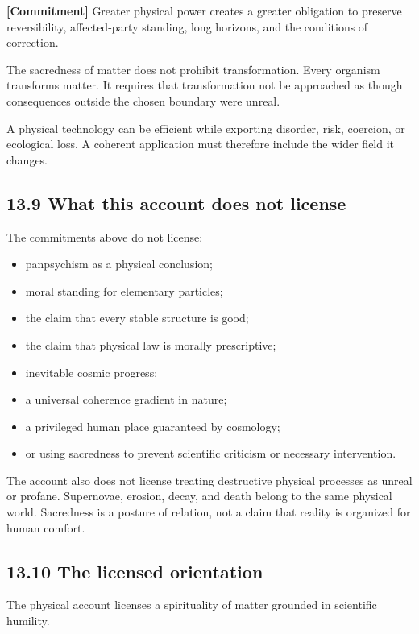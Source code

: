 \documentclass[
  11pt,
]{article}
\providecommand{\tightlist}{%
  \setlength{\itemsep}{0pt}\setlength{\parskip}{0pt}}
\begin{document}
\textbf{{[}Commitment{]}} Greater physical power creates a greater
obligation to preserve reversibility, affected-party standing, long
horizons, and the conditions of correction.

The sacredness of matter does not prohibit transformation. Every
organism transforms matter. It requires that transformation not be
approached as though consequences outside the chosen boundary were
unreal.

A physical technology can be efficient while exporting disorder, risk,
coercion, or ecological loss. A coherent application must therefore
include the wider field it changes.

\subsection{13.9 What this account does not
license}\label{what-this-account-does-not-license}

The commitments above do not license:

\begin{itemize}
\tightlist
\item
  panpsychism as a physical conclusion;
\item
  moral standing for elementary particles;
\item
  the claim that every stable structure is good;
\item
  the claim that physical law is morally prescriptive;
\item
  inevitable cosmic progress;
\item
  a universal coherence gradient in nature;
\item
  a privileged human place guaranteed by cosmology;
\item
  or using sacredness to prevent scientific criticism or necessary
  intervention.
\end{itemize}

The account also does not license treating destructive physical
processes as unreal or profane. Supernovae, erosion, decay, and death
belong to the same physical world. Sacredness is a posture of relation,
not a claim that reality is organized for human comfort.

\subsection{13.10 The licensed
orientation}\label{the-licensed-orientation}

The physical account licenses a spirituality of matter grounded in
scientific humility.
\end{document}
